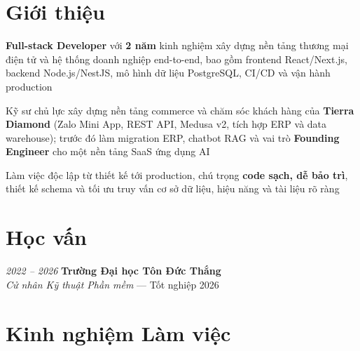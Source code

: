 \section{Giới thiệu}
\begin{onecolentry}
    \begin{highlights}
        \item \textbf{Full-stack Developer} với \textbf{2 năm} kinh nghiệm xây dựng nền tảng thương mại điện tử và hệ thống doanh nghiệp end-to-end, bao gồm frontend React/Next.js, backend Node.js/NestJS, mô hình dữ liệu PostgreSQL, CI/CD và vận hành production
        \item Kỹ sư chủ lực xây dựng nền tảng commerce và chăm sóc khách hàng của \textbf{Tierra Diamond} (Zalo Mini App, REST API, Medusa v2, tích hợp ERP và data warehouse); trước đó làm migration ERP, chatbot RAG và vai trò \textbf{Founding Engineer} cho một nền tảng SaaS ứng dụng AI
        \item Làm việc độc lập từ thiết kế tới production, chú trọng \textbf{code sạch, dễ bảo trì}, thiết kế schema và tối ưu truy vấn cơ sở dữ liệu, hiệu năng và tài liệu rõ ràng
    \end{highlights}
\end{onecolentry}


\section{Học vấn}
\begin{twocolentry}{\textit{2022 -- 2026}}
    \textbf{Trường Đại học Tôn Đức Thắng}\\[4pt]
    \textit{Cử nhân Kỹ thuật Phần mềm} --- Tốt nghiệp 2026
\end{twocolentry}


\section{Kinh nghiệm Làm việc}

